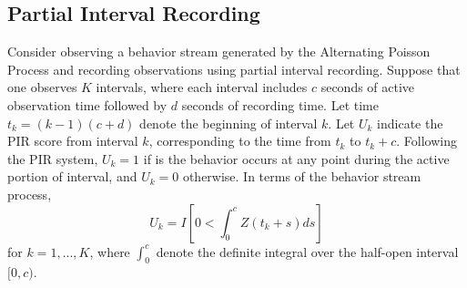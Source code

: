 \documentclass[man, noextraspace, floatsintext]{apa6}\usepackage[]{graphicx}\usepackage[]{color}
\begin{document}
\subsection{Partial Interval Recording}
\label{subsec:PIR}

Consider observing a behavior stream generated by the Alternating Poisson Process and recording observations using partial interval recording. 
Suppose that one observes $K$ intervals, where each interval includes $c$ seconds of active observation time followed by $d$ seconds of recording time. 
Let time $t_k = (k-1)(c + d)$ denote the beginning of interval $k$. Let $U_k$ indicate the PIR score from interval $k$, corresponding to the time from $t_k$ to $t_k + c$. 
Following the PIR system, $U_k = 1$ if is the behavior occurs at any point during the active portion of interval, and $U_k = 0$ otherwise. 
In terms of the behavior stream process, 
\begin{equation}
U_k = I\left[ 0 < \int_0^{c} Z\left(t_k + s \right) ds\right]
\end{equation}
for $k = 1,...,K$, where $\int_0^{c}$ denote the definite integral over the half-open interval $[0,c)$.
\end{document}
